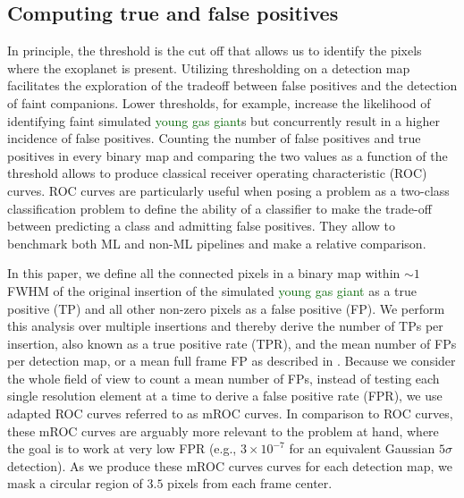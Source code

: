 \documentclass[referee]{aa} %
\newcommand{\newchange}[1]{\textcolor{darkgreen}{#1}}
\begin{document}
\subsection{Computing true and false positives}
\label{sec:TPFP}


In principle, the threshold is the cut off that allows us to identify the pixels where the exoplanet is present.
Utilizing thresholding on a detection map facilitates the exploration of the tradeoff between false positives and the detection of faint companions. Lower thresholds, for example, increase the likelihood of identifying faint simulated \newchange{young gas giant}s but concurrently result in a higher incidence of false positives.
Counting the number of false positives and true positives in every binary map and comparing the two values as a function of the threshold allows to produce classical receiver operating characteristic (ROC) curves. 
ROC curves are particularly useful when posing a problem as a two-class classification problem to define the ability of a classifier to make the trade-off between predicting a class and admitting false positives.
They allow to benchmark both ML and non-ML pipelines and make a relative comparison. 

In this paper, we define all the connected pixels in a binary map within $\sim 1$ FWHM of the original insertion of the simulated \newchange{young gas giant} as a true positive (TP) and all other non-zero pixels as a false positive (FP). We perform this analysis over multiple insertions and thereby derive the number of TPs per insertion, also known as a true positive rate (TPR), and the mean number of FPs per detection map, or a mean full frame FP as described in \citet{2018Gomez}. Because we consider the whole field of view to count a mean number of FPs, instead of testing each single resolution element at a time to derive a false positive rate (FPR), we use adapted ROC curves referred to as mROC curves. In comparison to ROC curves, these mROC curves are arguably more relevant to the problem at hand, where the goal is to work at very low FPR (e.g., $3\times 10^{-7}$ for an equivalent Gaussian $5\sigma$ detection). As we produce these mROC curves  curves for each detection map, we mask a circular region of $3.5$ pixels from each frame center.
\end{document}
